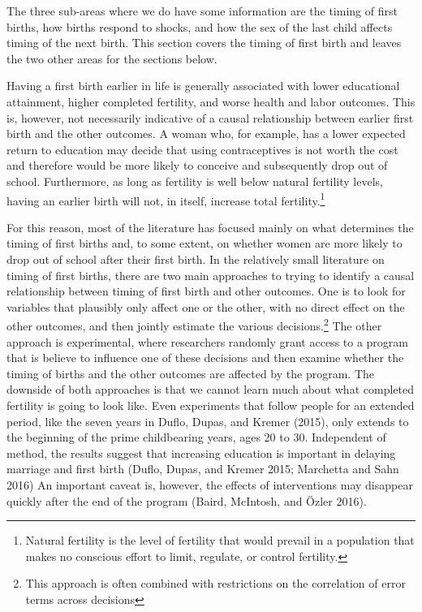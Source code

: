\documentclass[]{article}
\begin{document}
The three sub-areas where we do have some information are the timing of first births, how births respond to shocks, and how the sex of the last child affects timing of the next birth. This section covers the timing of first birth and leaves the two other areas for the sections below.

Having a first birth earlier in life is generally associated with lower educational attainment, higher completed fertility, and worse health and labor outcomes. This is, however, not necessarily indicative of a causal relationship between earlier first birth and the other outcomes. A woman who, for example, has a lower expected return to education may decide that using contraceptives is not worth the cost and therefore would be more likely to conceive and subsequently drop out of school. Furthermore, as long as fertility is well below natural fertility levels, having an earlier birth will not, in itself, increase total fertility.\footnote{Natural fertility is the level of fertility that would prevail in a population that makes no conscious effort to limit, regulate, or control fertility.}

For this reason, most of the literature has focused mainly on what determines the timing of first births and, to some extent, on whether women are more likely to drop out of school after their first birth. In the relatively small literature on timing of first births, there are two main approaches to trying to identify a causal relationship between timing of first birth and other outcomes. One is to look for variables that plausibly only affect one or the other, with no direct effect on the other outcomes, and then jointly estimate the various decisions.\footnote{This approach is often combined with restrictions on the correlation of error terms across decisions} The other approach is experimental, where researchers randomly grant access to a program that is believe to influence one of these decisions and then examine whether the timing of births and the other outcomes are affected by the program. The downside of both approaches is that we cannot learn much about what completed fertility is going to look like. Even experiments that follow people for an extended period, like the seven years in Duflo, Dupas, and Kremer (2015), only extends to the beginning of the prime childbearing years, ages 20 to 30. Independent of method, the results suggest that increasing education is important in delaying marriage and first birth (Duflo, Dupas, and Kremer 2015; Marchetta and Sahn 2016) An important caveat is, however, the effects of interventions may disappear quickly after the end of the program (Baird, McIntosh, and Özler 2016).
\end{document}
